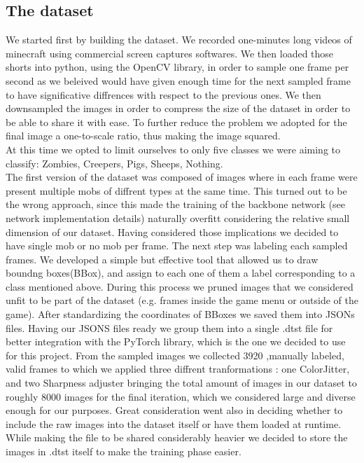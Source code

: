\documentclass[10pt,journal,cspaper,compsoc]{IEEEtran}
\begin{document}
    \subsection{The dataset}
    We started first by building the dataset. We recorded one-minutes long videos of minecraft using commercial screen captures softwares. We then loaded those shorts into python, using the OpenCV library, in order to sample one frame per second as we 
    beleived would have given enough time for the next sampled frame to have significative diffrences with respect to the previous ones. We then downsampled the images in order to compress the size of the dataset in order to be able to share it with ease. To further 
    reduce the problem we adopted for the final image a one-to-scale ratio, thus making the image squared.\\ At this time we opted to limit ourselves to only five classes we were aiming to classify: Zombies, Creepers, Pigs, Sheeps, Nothing.\\
    The first version of the dataset was composed of images where in each frame were present multiple mobs of diffrent types at the same time. This turned out to be the wrong approach, since this made the training of the backbone network (see network implementation details) naturally overfitt considering the relative small dimension of our dataset.
    Having considered those implications we decided to have single mob or no mob per frame.
    The next step was labeling each sampled frames. We developed a simple but effective tool that allowed us to draw boundng boxes(BBox), and assign to each one of them a label corresponding to a class mentioned above. During this process we pruned images that we considered
    unfit to be part of the dataset (e.g. frames inside the game menu or outside of the game). After standardizing the coordinates of BBoxes we saved them into JSONs files. Having our JSONS files ready we group them into a single .dtst file for better integration with the PyTorch
    library, which is the one we decided to use for this project. 
    From the sampled images we collected 3920  ,manually labeled, valid frames to which we applied three diffrent tranformations : one  ColorJitter, and two Sharpness adjuster bringing the total amount of images in our dataset to roughly 8000 images for the final iteration, which we considered large and diverse enough for our purposes.
    Great consideration went also in deciding whether to include the raw images into the dataset itself or have them loaded at runtime. While making the file to be shared considerably heavier we decided to store the images in .dtst itself to make the training phase easier.
\end{document}
